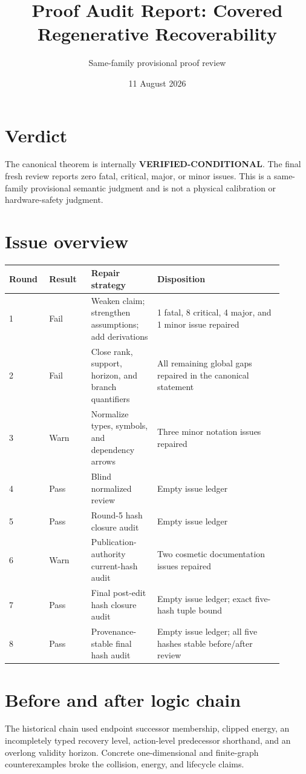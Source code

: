 \documentclass[11pt]{article}
\title{Proof Audit Report: Covered Regenerative Recoverability}
\author{Same-family provisional proof review}
\date{11 August 2026}
\newcommand{\beforebox}[1]{\par\noindent\colorbox{red!12}{\parbox{0.94\linewidth}{#1}}\par}
\begin{document}
\maketitle

\section{Verdict}
The canonical theorem is internally \textbf{VERIFIED-CONDITIONAL}.  The final
fresh review reports zero fatal, critical, major, or minor issues.  This is a
same-family provisional semantic judgment and is not a physical calibration or
hardware-safety judgment.

\section{Issue overview}
\begin{longtable}{p{0.12\linewidth}p{0.14\linewidth}p{0.22\linewidth}p{0.42\linewidth}}
\toprule
Round & Result & Repair strategy & Disposition \\
\midrule
1 & Fail & Weaken claim; strengthen assumptions; add derivations &
1 fatal, 8 critical, 4 major, and 1 minor issue repaired \\
2 & Fail & Close rank, support, horizon, and branch quantifiers &
All remaining global gaps repaired in the canonical statement \\
3 & Warn & Normalize types, symbols, and dependency arrows &
Three minor notation issues repaired \\
4 & Pass & Blind normalized review & Empty issue ledger \\
5 & Pass & Round-5 hash closure audit & Empty issue ledger \\
6 & Warn & Publication-authority current-hash audit & Two cosmetic documentation issues repaired \\
7 & Pass & Final post-edit hash closure audit & Empty issue ledger; exact five-hash tuple bound \\
8 & Pass & Provenance-stable final hash audit & Empty issue ledger; all five hashes stable before/after review \\
\bottomrule
\end{longtable}

\section{Before and after logic chain}
\beforebox{The historical chain used endpoint successor membership, clipped
energy, an incompletely typed recovery level, action-level predecessor
shorthand, and an overlong validity horizon.  Concrete one-dimensional and
finite-graph counterexamples broke the collision, energy, and lifecycle
claims.}
\end{document}
